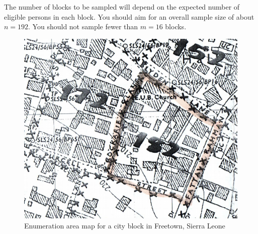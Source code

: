 \documentclass[12pt,a4paper]{book}
\theoremstyle{definition}
\theoremstyle{definition}
\theoremstyle{definition}
\theoremstyle{remark}
\begin{document}
The number of blocks to be sampled will depend on the expected number of
eligible persons in each block. You should aim for an overall sample
size of about \(n = 192\). You should not sample fewer than \(m = 16\)
blocks.

\begin{figure}[H]

{\centering \includegraphics{figures/stage2sample11} 

}

\caption{Enumeration area map for a city block in Freetown, Sierra Leone}\label{fig:sample25}
\end{figure}
\end{document}
